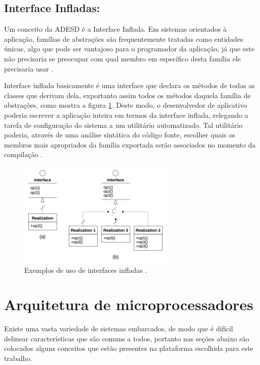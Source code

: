 \subsection{Interface Infladas: } Um conceito da ADESD é a Interface Inflada. %
Em sistemas orientados à aplicação, famílias de abstrações são frequentemente tratadas como entidades únicas, algo que pode ser vantajoso para o programador da aplicação, já que este não precisaria se preocupar com qual membro em específico desta família ele precisaria usar \cite{guto_thesis}.

Interface inflada basicamente é uma interface que declara os métodos de todas as classes que derivam dela, exportanto assim todos os métodos daquela família de abstrações, como mostra a figura \ref{fig:inflated}. Deste modo, o desenvolvedor de aplicativo poderia escrever a aplicação inteira em termos da interface inflada, relegando a tarefa de configuração do sistema a um utilitário automatizado. Tal utilitário poderia, através de uma análise sintática do código fonte, escolher quais os membros mais apropriados da família exportada serão associados no momento da compilação \cite[p.~56]{guto_thesis}.

\begin{figure}[ht!]
	\label{fig:inflated}
    \centering
    \includegraphics[width=7.5cm]{figuras/inflated_interface}
    \caption{Exemplos de uso de interfaces infladas \cite{guto_thesis}.}
\end{figure}




\section{Arquitetura de microprocessadores}

Existe uma vasta variedade de sistemas embarcados, de modo que é difícil delinear características que são comuns a todos, portanto nas seções abaixo são colocados alguns conceitos que estão presentes na plataforma escolhida para este trabalho.


